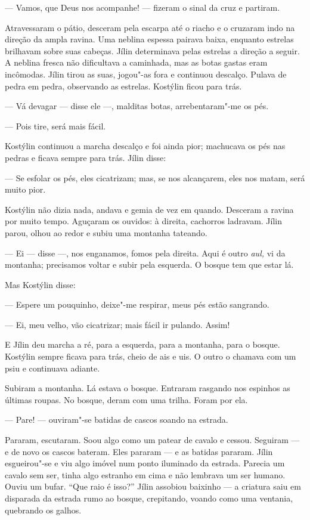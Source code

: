 --- Vamos, que Deus nos acompanhe! --- fizeram o sinal da cruz e
partiram.

Atravessaram o pátio, desceram pela escarpa até o riacho e o cruzaram
indo na direção da ampla ravina. Uma neblina espessa pairava baixa,
enquanto estrelas brilhavam sobre suas cabeças. Jílin determinava pelas
estrelas a direção a seguir. A neblina fresca não dificultava a
caminhada, mas as botas gastas eram incômodas. Jílin tirou as suas,
jogou"-as fora e continuou descalço. Pulava de pedra em pedra, observando
as estrelas. Kostýlin ficou para trás.

--- Vá devagar --- disse ele ---, malditas botas, arrebentaram"-me os
pés.

--- Pois tire, será mais fácil.

Kostýlin continuou a marcha descalço e foi ainda pior; machucava os pés
nas pedras e ficava sempre para trás. Jílin disse:

--- Se esfolar os pés, eles cicatrizam; mas, se nos alcançarem, eles nos
matam, será muito pior.

Kostýlin não dizia nada, andava e gemia de vez em quando. Desceram a
ravina por muito tempo. Aguçaram os ouvidos: à direita, cachorros
ladravam. Jílin parou, olhou ao redor e subiu uma montanha tateando.

--- Ei --- disse ---, nos enganamos, fomos pela direita. Aqui é outro
\emph{aul,} vi da montanha; precisamos voltar e subir pela esquerda. O
bosque tem que estar lá.

Mas Kostýlin disse:

--- Espere um pouquinho, deixe"-me respirar, meus pés estão sangrando.

--- Ei, meu velho, vão cicatrizar; mais fácil ir pulando. Assim!

E Jílin deu marcha a ré, para a esquerda, para a montanha, para o
bosque. Kostýlin sempre ficava para trás, cheio de ais e uis. O outro o
chamava com um psiu e continuava adiante.

Subiram a montanha. Lá estava o bosque. Entraram rasgando nos espinhos
as últimas roupas. No bosque, deram com uma trilha. Foram por ela.

--- Pare! --- ouviram"-se batidas de cascos soando na estrada.

Pararam, escutaram. Soou algo como um patear de cavalo e cessou.
Seguiram --- e de novo os cascos bateram. Eles pararam --- e as batidas
pararam. Jílin esgueirou"-se e viu algo imóvel num ponto iluminado da
estrada. Parecia um cavalo sem ser, tinha algo estranho em cima e não
lembrava um ser humano. Ouviu um bufar. ``Que raio é isso?'' Jílin assobiou
baixinho --- a criatura saiu em disparada da estrada rumo ao bosque,
crepitando, voando como uma ventania, quebrando os galhos.

